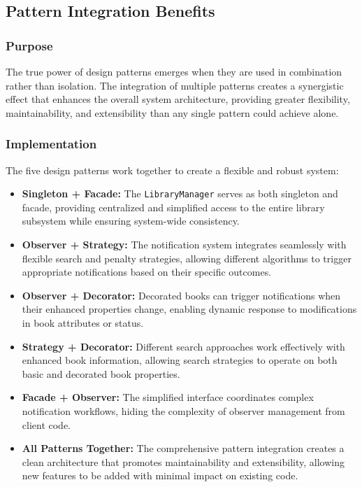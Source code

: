 \newpage

\subsection{Pattern Integration Benefits}
\subsubsection{Purpose}
The true power of design patterns emerges when they are used in combination rather than isolation. The integration of multiple patterns creates a synergistic effect that enhances the overall system architecture, providing greater flexibility, maintainability, and extensibility than any single pattern could achieve alone.

\subsubsection{Implementation}
The five design patterns work together to create a flexible and robust system:

\begin{itemize}
    \item \textbf{Singleton + Facade:} The \texttt{LibraryManager} serves as both singleton and facade, providing centralized and simplified access to the entire library subsystem while ensuring system-wide consistency.
    
    \item \textbf{Observer + Strategy:} The notification system integrates seamlessly with flexible search and penalty strategies, allowing different algorithms to trigger appropriate notifications based on their specific outcomes.
    
    \item \textbf{Observer + Decorator:} Decorated books can trigger notifications when their enhanced properties change, enabling dynamic response to modifications in book attributes or status.
    
    \item \textbf{Strategy + Decorator:} Different search approaches work effectively with enhanced book information, allowing search strategies to operate on both basic and decorated book properties.
    
    \item \textbf{Facade + Observer:} The simplified interface coordinates complex notification workflows, hiding the complexity of observer management from client code.
    
    \item \textbf{All Patterns Together:} The comprehensive pattern integration creates a clean architecture that promotes maintainability and extensibility, allowing new features to be added with minimal impact on existing code.
\end{itemize}

